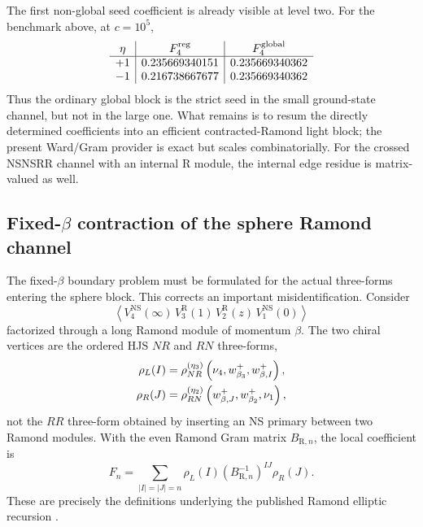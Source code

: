\documentclass[11pt]{article}
\newcommand{\NS}{\mathrm{NS}}
\newcommand{\R}{\mathrm{R}}
\begin{document}
The first non-global seed coefficient is already visible at level two.  For
the benchmark above, at $c=10^5$,
\begin{equation}
 \begin{array}{c|c|c}
 \eta & F_{4}^{\rm reg} & F_{4}^{\rm global}\\
 \hline
 +1&0.235669340151&0.235669340362\\
 -1&0.216738667677&0.235669340362
 \end{array}
 \label{eq:ramond-regular-seed-level-two}
\end{equation}
Thus the ordinary global block is the strict seed in the small
ground-state channel, but not in the large one.  What remains is to resum
the directly determined coefficients into an efficient contracted-Ramond
light block; the present Ward/Gram provider is exact but scales
combinatorially.  For the crossed NSNSRR channel with an internal R module,
the internal edge residue is matrix-valued as well.

\subsection{Fixed-\texorpdfstring{\(\beta\)}{beta} contraction of the
sphere Ramond channel}
\label{sec:fixed-beta-r-contracted-seed}

The fixed-\(\beta\) boundary problem must be formulated for the actual
three-forms entering the sphere block.  This corrects an important
misidentification.  Consider
\begin{equation}
 \left\langle
 V^{\NS}_4(\infty)\,
 V^{\R}_3(1)\,
 V^{\R}_2(z)\,
 V^{\NS}_1(0)
 \right\rangle
 \label{eq:fixed-beta-r-sphere-correlator}
\end{equation}
factorized through a long Ramond module of momentum \(\beta\).  The two
chiral vertices are the ordered HJS \(NR\) and \(RN\) three-forms,
\begin{align}
 \rho_L(I)
 &=
 \rho_{NR}^{(\eta_3)}
 \left(\nu_4,w_{\beta_3}^{+},w_{\beta,I}^{+}\right),
 \notag\\
 \rho_R(J)
 &=
 \rho_{RN}^{(\eta_2)}
 \left(w_{\beta,J}^{+},w_{\beta_2}^{+},\nu_1\right),
 \label{eq:fixed-beta-r-nr-rn-forms}
\end{align}
not the \(RR\) three-form obtained by inserting an NS primary between two
Ramond modules.  With the even Ramond Gram matrix \(B_{\R,n}\), the local
coefficient is
\begin{equation}
 F_n
 =
 \sum_{|I|=|J|=n}
 \rho_L(I)
 \left(B_{\R,n}^{-1}\right)^{IJ}
 \rho_R(J).
 \label{eq:fixed-beta-r-local-coefficient}
\end{equation}
These are precisely the definitions underlying the published Ramond
elliptic recursion \cite{Suchanek2011EllipticRecursion}.
\end{document}
